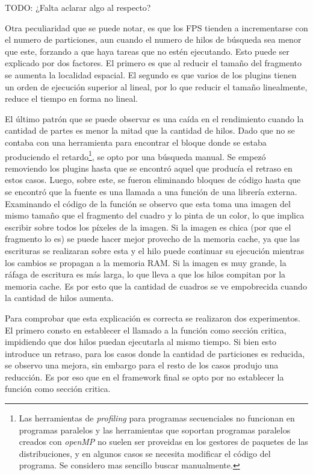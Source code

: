 TODO: ¿Falta aclarar algo al respecto?

Otra peculiaridad que se puede notar, es que los FPS tienden a incrementarse con
el numero de particiones, aun cuando el numero de hilos de búsqueda sea menor
que este, forzando a que haya tareas que no estén ejecutando. Esto puede ser
explicado por dos factores. El primero es que al reducir el tamaño del fragmento
se aumenta la localidad espacial. El segundo es que varios de los plugins tienen
un orden de ejecución superior al lineal, por lo que reducir el tamaño
linealmente, reduce el tiempo en forma no lineal.

El último patrón que se puede observar es una caída en el rendimiento cuando la
cantidad de partes es menor la mitad que la cantidad de hilos. Dado que no se
contaba con una herramienta para encontrar el bloque donde se estaba produciendo
el retardo\footnote{Las herramientas de \emph{profiling} para programas
secuenciales no funcionan en programas paralelos y las herramientas que soportan
programas paralelos creados con \emph{openMP} no suelen ser proveidas en los
gestores de paquetes de las distribuciones, y en algunos casos se necesita
modificar el código del programa. Se considero mas sencillo buscar
manualmente.}, se opto por una búsqueda manual. Se empezó removiendo los
plugins hasta que se encontró aquel que producía el retraso en estos casos.
Luego, sobre este, se fueron eliminando bloques de código hasta que se encontró
que la fuente es una llamada a una función de una librería externa. Examinando
el código de la función se observo que esta toma una imagen del mismo tamaño que
el fragmento del cuadro y lo pinta de un color, lo que implica escribir sobre
todos los píxeles de la imagen. Si la imagen es chica (por que el fragmento lo
es) se puede hacer mejor provecho de la memoria cache, ya que las escrituras se
realizaran sobre esta y el hilo puede continuar su ejecución mientras los
cambios se propagan a la memoria RAM. Si la imagen es muy grande, la ráfaga de
escritura es más larga, lo que lleva a que los hilos compitan por la memoria
cache. Es por esto que la cantidad de cuadros se ve empobrecida cuando la
cantidad de hilos aumenta.

Para comprobar que esta explicación es correcta se realizaron dos experimentos.
El primero consto en establecer el llamado a la función como sección critica,
impidiendo que dos hilos puedan ejecutarla al mismo tiempo. Si bien esto
introduce un retraso, para los casos donde la cantidad de particiones es
reducida, se observo una mejora, sin embargo para el resto de los casos produjo
una reducción. Es por eso que en el framework final se opto por no
establecer la función como sección critica.

